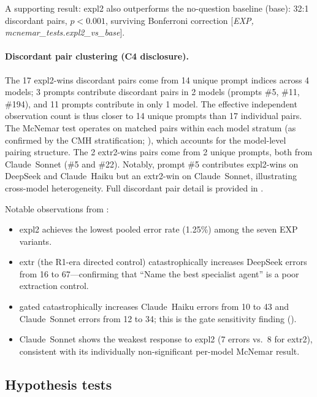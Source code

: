 \documentclass[11pt,a4paper]{article}
\begin{document}
\noindent A supporting result: \textsf{expl2} also outperforms the no-question baseline
(\textsf{base}): 32:1 discordant pairs, $p < 0.001$, surviving Bonferroni correction
[\emph{EXP, mcnemar\_tests.expl2\_vs\_base}].

\paragraph{Discordant pair clustering (C4 disclosure).}
The 17 expl2-wins discordant pairs come from 14 unique prompt indices across 4
models; 3 prompts contribute discordant pairs in 2 models (prompts \#5, \#11,
\#194), and 11 prompts contribute in only 1 model.  The effective independent
observation count is thus closer to 14 unique prompts than 17 individual
pairs.  The McNemar test operates on matched pairs within each model stratum
(as confirmed by the CMH stratification; ), which accounts
for the model-level pairing structure.  The 2 extr2-wins pairs come from
2 unique prompts, both from Claude~Sonnet (\#5 and \#22).  Notably, prompt
\#5 contributes expl2-wins on DeepSeek and Claude~Haiku but an extr2-win on
Claude~Sonnet, illustrating cross-model heterogeneity.  Full discordant pair
detail is provided in .

\noindent Notable observations from :
\begin{itemize}[noitemsep]
  \item \textsf{expl2} achieves the lowest pooled error
    rate (1.25\%) among the seven EXP variants.
  \item \textsf{extr} (the R1-era directed control) catastrophically
    increases DeepSeek errors from 16 to 67---confirming that
    ``Name the best specialist agent'' is a poor extraction control.
  \item \textsf{gated} catastrophically increases Claude~Haiku errors
    from 10 to 43 and Claude~Sonnet errors from 12 to 34; this is the
    gate sensitivity finding ().
  \item Claude~Sonnet shows the weakest response to \textsf{expl2}
    (7 errors vs.\ 8 for \textsf{extr2}), consistent with its
    individually non-significant per-model McNemar result.
\end{itemize}

\subsection{Hypothesis tests}
\end{document}
